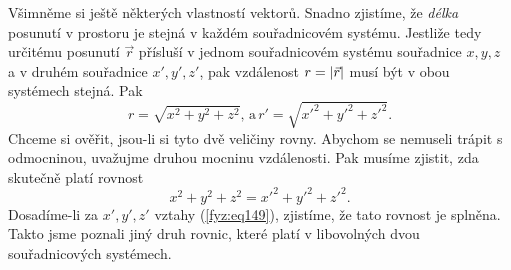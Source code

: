     Všimněme si ještě některých vlastností vektorů. Snadno zjistíme, že \emph{délka} posunutí v 
    prostoru je stejná v každém souřadnicovém systému. Jestliže tedy určitému posunutí \(\vec{r}\) 
    přísluší v jednom souřadnicovém systému souřadnice \(x, y, z\) a v druhém souřadnice \(x', y', 
    z'\), pak vzdálenost \(r = \left\lvert\vec{r}\right\rvert\) musí být v obou systémech stejná. Pak
    \begin{equation*}
      r  = \sqrt{x^2+y^2+z^2}, \,\text{a}\,
      r' = \sqrt{{x'}^2+{y'}^2+{z'}^2}.
    \end{equation*}
    Chceme si ověřit, jsou-li si tyto dvě veličiny rovny. Abychom se nemuseli trápit s odmocninou, 
    uvažujme druhou mocninu vzdálenosti. Pak musíme zjistit, zda skutečně platí rovnost
    \begin{equation}\label{fyz:eq160}
      x^2+y^2+z^2 = {x'}^2+{y'}^2+{z'}^2.
    \end{equation}
    Dosadíme-li za \(x', y', z'\) vztahy (\ref{fyz:eq149}), zjistíme, že tato rovnost je splněna. 
    Takto jsme poznali jiný druh rovnic, které platí v libovolných dvou souřadnicových systémech.
    
